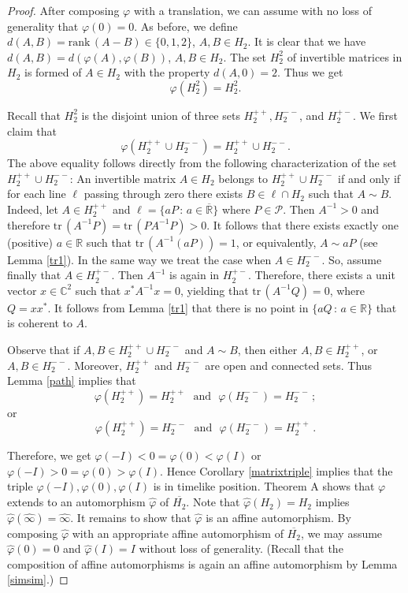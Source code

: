\documentclass[10pt]{amsart}
\theoremstyle{definition}
\theoremstyle{remark}
\numberwithin{subsection}{section}
\numberwithin{equation}{section}
\newcommand\oH{{\overline{H_2}}}
\newcommand\oi{{\widehat{\infty}}}
\newcommand\oR{{\overline{\mathbb{R}}}}
\begin{document}
\begin{proof}
After composing $\varphi$ with a translation, we can assume with no loss of generality that $\varphi (0) =0$. 
As before, we define $d(A,B) = \mathrm{rank}\, (A-B) \in \{ 0,1,2 \}$, $A,B \in H_2$. It is clear that we have $d(A,B) = d( \varphi (A) , \varphi (B))$, $A, B \in H_2$. 
The set $H_2^2$ of invertible matrices in $H_2$ is formed of $A\in H_2$ with the property $d(A,0) = 2$. Thus we get 
\[
\varphi(H_2^2)=H_2^2.
\] 

Recall that $H_2^2$ is the disjoint union of three sets $H_2^{++}, H_2^{--}$, and $H_2^{+-}$.
We first claim that 
\[
\varphi ( H_{2}^{++} \cup H_{2}^{--} ) = H_{2}^{++} \cup H_{2}^{--} .
\]
The above equality follows directly from the following characterization of the set $H_{2}^{++} \cup H_{2}^{--}$: An invertible matrix $A \in H_2$ belongs to $H_{2}^{++} \cup H_{2}^{--}$ if and only if for each line $\ell$ passing through zero there exists $B \in \ell\cap H_2$ such that $A \sim B$. 
Indeed, let $A \in H_{2}^{++}$ and $\ell = \{ aP \, : \, a \in {\oR}\}$ where $P \in \mathcal{P}$. Then $A^{-1} > 0$ and therefore $\mathrm{tr}\, (A^{-1}P) = \mathrm{tr}\, (P A^{-1}P) >0$. It follows that there exists exactly one (positive) $a \in \mathbb{R}$ such that $\mathrm{tr}\, (A^{-1}(aP)) = 1$, or equivalently, $A \sim aP$ (see Lemma \ref{tr1}).
In the same way we treat the case when $A \in H_{2}^{--}$. So, assume finally that $A \in H_{2}^{+-}$. Then $A^{-1}$ is again in $H_{2}^{+-}$. 
Therefore, there exists a unit vector $x \in \mathbb{C}^2$ such that $x^ \ast A^{-1}x = 0$, yielding that $\mathrm{tr}\, (A^{-1}Q) = 0$, where $Q = xx^\ast$. 
It follows from Lemma \ref{tr1} that there is no point in $\{ aQ \, : \, a \in \mathbb{R} \}$ that is coherent to $A$.

Observe that if $A,B \in H_{2}^{++} \cup H_{2}^{--}$ and $A \sim B$, then either $A,B \in H_{2}^{++}$, or $A,B \in H_{2}^{--}$. 
Moreover, $H_2^{++}$ and $H_2^{--}$ are open and connected sets. 
Thus Lemma \ref{path} implies that
\[
\varphi ( H_{2}^{++} ) = H_{2}^{++}  \ \ \ \text{and} \ \ \  \varphi ( H_{2}^{--} ) = H_{2}^{--} \, ;
\]
or 
\[
\varphi ( H_{2}^{++} ) = H_{2}^{--}  \ \ \ \text{and} \ \ \  \varphi ( H_{2}^{--} ) = H_{2}^{++} \, .
\]

Therefore, we get $\varphi(-I)<0=\varphi(0)<\varphi(I)$ or $\varphi(-I)>0=\varphi(0)>\varphi(I)$.
Hence Corollary \ref{matrixtriple} implies that the triple $\varphi(-I), \varphi(0), \varphi(I)$ is in timelike position. 
Theorem A shows that $\varphi$ extends to an automorphism $\hat{\varphi}$ of $\oH$. 
Note that $\hat{\varphi}(H_2)=H_2$ implies $\hat{\varphi}(\oi)=\oi$.
It remains to show that $\hat{\varphi}$ is an affine automorphism.
By composing $\hat{\varphi}$ with an appropriate affine automorphism of $\oH$, we may assume $\hat{\varphi}(0)=0$ and $\hat{\varphi}(I)=I$ without loss of generality. (Recall that the composition of affine automorphisms is again an affine automorphism by Lemma \ref{simsim}.) 


\end{proof}
\end{document}
